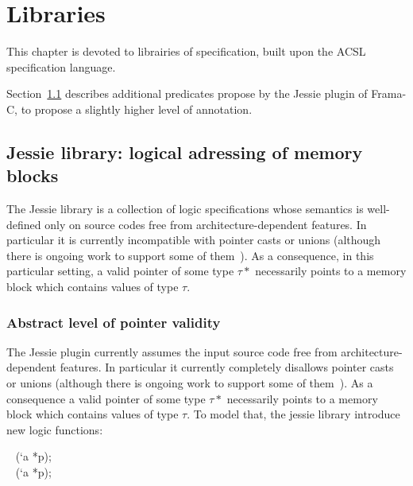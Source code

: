 \chapter{Libraries}
\label{chap:lib}

This chapter is devoted to librairies of specification, built upon the ACSL specification language.

Section~\ref{sec:jessie} describes additional predicates propose by the Jessie plugin of Frama-C, to propose a slightly higher level of annotation.


%

\section{Jessie library: logical adressing of memory blocks}
\label{sec:jessie}


The Jessie library is a collection of logic specifications whose
semantics is well-defined only on source codes free from
architecture-dependent features. In particular it is currently
incompatible with pointer casts or unions (although there is ongoing
work to support some of them~\cite{moy07ccpp}). As a consequence, in
this particular setting, a valid pointer of some type $\tau*$
necessarily points to a memory block which contains values of type
$\tau$.

\subsection{Abstract level of pointer validity}

The Jessie plugin currently assumes the input source code free from
architecture-dependent features. In particular it currently completely
disallows pointer casts or unions (although there is ongoing work to
support some of them~\cite{moy07ccpp}). As a consequence a valid
pointer of some type $\tau*$ necessarily points to a memory block
which contains values of type $\tau$. To model that, the jessie library introduce new logic functions:
\begin{flushleft}
\integer ~ \offsetmin(`a *p); \\
\integer ~ \offsetmax(`a *p);
\end{flushleft}

